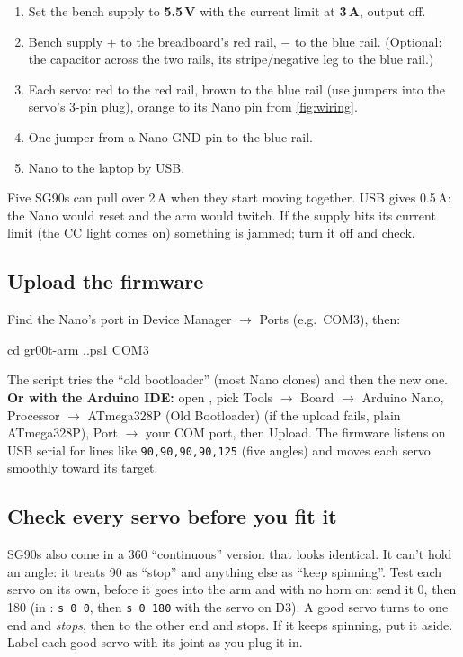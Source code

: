 \documentclass[11pt]{article}
\newcommand{\file}[1]{\texttt{\detokenize{#1}}}
\begin{document}
\begin{enumerate}
\item Set the bench supply to \textbf{5.5\,V} with the current limit at \textbf{3\,A}, output off.
\item Bench supply $+$ to the breadboard's red rail, $-$ to the blue rail. (Optional: the
  capacitor across the two rails, its stripe/negative leg to the blue rail.)
\item Each servo: red to the red rail, brown to the blue rail (use jumpers into the servo's
  3-pin plug), orange to its Nano pin from \cref{fig:wiring}.
\item One jumper from a Nano GND pin to the blue rail.
\item Nano to the laptop by USB.
\end{enumerate}
\begin{note}
Five SG90s can pull over 2\,A when they start moving together. USB gives 0.5\,A: the Nano
would reset and the arm would twitch. If the supply hits its current limit (the CC light
comes on) something is jammed; turn it off and check.
\end{note}

\subsection{Upload the firmware}
Find the Nano's port in Device Manager $\rightarrow$ Ports (e.g.\ COM3), then:
\begin{cmd}
cd gr00t-arm\firmware
.\upload.ps1 COM3
\end{cmd}
The script tries the ``old bootloader'' (most Nano clones) and then the new one.
\textbf{Or with the Arduino IDE:} open \file{firmware/arm/arm.ino}, pick Tools $\rightarrow$ Board
$\rightarrow$ Arduino Nano, Processor $\rightarrow$ ATmega328P (Old Bootloader) (if the upload fails,
plain ATmega328P), Port $\rightarrow$ your COM port, then Upload. The firmware
listens on USB serial for lines like \texttt{90,90,90,90,125} (five angles) and moves each
servo smoothly toward its target.

\subsection{Check every servo before you fit it}
\label{sec:servotest}
SG90s also come in a 360\textdegree{} ``continuous'' version that looks identical. It can't
hold an angle: it treats 90 as ``stop'' and anything else as ``keep spinning''. Test each servo
on its own, before it goes into the arm and with no horn on: send it 0, then 180 (in
\file{calibrate.py}: \texttt{s 0 0}, then \texttt{s 0 180} with the servo on D3). A good servo
turns to one end and \emph{stops}, then to the other end and stops. If it keeps spinning, put it
aside. Label each good servo with its joint as you plug it in.
\end{document}
